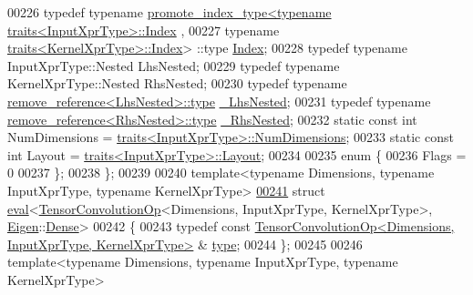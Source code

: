 \begin{DoxyCode}
00226   \textcolor{keyword}{typedef} \textcolor{keyword}{typename} \hyperlink{struct_eigen_1_1internal_1_1promote__index__type}{promote\_index\_type<typename traits<InputXprType>::Index}
      ,
00227                                       \textcolor{keyword}{typename} \hyperlink{struct_eigen_1_1internal_1_1traits}{traits<KernelXprType>::Index}>
      ::type \hyperlink{namespace_eigen_a62e77e0933482dafde8fe197d9a2cfde}{Index};
00228   \textcolor{keyword}{typedef} \textcolor{keyword}{typename} InputXprType::Nested LhsNested;
00229   \textcolor{keyword}{typedef} \textcolor{keyword}{typename} KernelXprType::Nested RhsNested;
00230   \textcolor{keyword}{typedef} \textcolor{keyword}{typename} \hyperlink{group___sparse_core___module}{remove\_reference<LhsNested>::type} 
      \hyperlink{group___sparse_core___module}{\_LhsNested};
00231   \textcolor{keyword}{typedef} \textcolor{keyword}{typename} \hyperlink{group___sparse_core___module}{remove\_reference<RhsNested>::type} 
      \hyperlink{group___sparse_core___module}{\_RhsNested};
00232   \textcolor{keyword}{static} \textcolor{keyword}{const} \textcolor{keywordtype}{int} NumDimensions = \hyperlink{struct_eigen_1_1internal_1_1traits}{traits<InputXprType>::NumDimensions};
00233   \textcolor{keyword}{static} \textcolor{keyword}{const} \textcolor{keywordtype}{int} Layout = \hyperlink{struct_eigen_1_1internal_1_1traits}{traits<InputXprType>::Layout};
00234 
00235   \textcolor{keyword}{enum} \{
00236     Flags = 0
00237   \};
00238 \};
00239 
00240 \textcolor{keyword}{template}<\textcolor{keyword}{typename} Dimensions, \textcolor{keyword}{typename} InputXprType, \textcolor{keyword}{typename} KernelXprType>
\hyperlink{struct_eigen_1_1internal_1_1eval_3_01_tensor_convolution_op_3_01_dimensions_00_01_input_xpr_type57757a1b6151765c50323fde8ef0519e}{00241} \textcolor{keyword}{struct }\hyperlink{struct_eigen_1_1internal_1_1eval}{eval}<\hyperlink{class_eigen_1_1_tensor_convolution_op}{TensorConvolutionOp}<Dimensions, InputXprType, KernelXprType>, 
      \hyperlink{namespace_eigen}{Eigen}::\hyperlink{struct_eigen_1_1_dense}{Dense}>
00242 \{
00243   \textcolor{keyword}{typedef} \textcolor{keyword}{const} \hyperlink{class_eigen_1_1_tensor_convolution_op}{TensorConvolutionOp<Dimensions, InputXprType, KernelXprType>}
      & \hyperlink{class_eigen_1_1_tensor_convolution_op}{type};
00244 \};
00245 
00246 \textcolor{keyword}{template}<\textcolor{keyword}{typename} Dimensions, \textcolor{keyword}{typename} InputXprType, \textcolor{keyword}{typename} KernelXprType>

\end{DoxyCode}
